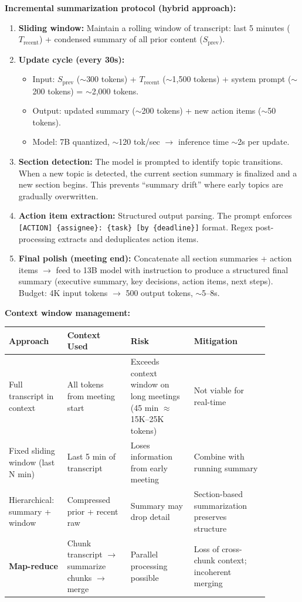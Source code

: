\textbf{Incremental summarization protocol (hybrid approach):}

\begin{enumerate}
  \item \textbf{Sliding window:} Maintain a rolling window of transcript: last 5 minutes ($T_{\text{recent}}$) + condensed summary of all prior content ($S_{\text{prev}}$).
  \item \textbf{Update cycle (every 30s):}
  \begin{itemize}
    \item Input: $S_{\text{prev}}$ ($\sim$300 tokens) + $T_{\text{recent}}$ ($\sim$1,500 tokens) + system prompt ($\sim$200 tokens) = $\sim$2,000 tokens.
    \item Output: updated summary ($\sim$200 tokens) + new action items ($\sim$50 tokens).
    \item Model: 7B quantized, $\sim$120 tok/sec $\rightarrow$ inference time $\sim$2s per update.
  \end{itemize}
  \item \textbf{Section detection:} The model is prompted to identify topic transitions. When a new topic is detected, the current section summary is finalized and a new section begins. This prevents ``summary drift'' where early topics are gradually overwritten.
  \item \textbf{Action item extraction:} Structured output parsing. The prompt enforces \texttt{[ACTION] \{assignee\}: \{task\} [by \{deadline\}]} format. Regex post-processing extracts and deduplicates action items.
  \item \textbf{Final polish (meeting end):} Concatenate all section summaries + action items $\rightarrow$ feed to 13B model with instruction to produce a structured final summary (executive summary, key decisions, action items, next steps). Budget: 4K input tokens $\rightarrow$ 500 output tokens, $\sim$5--8s.
\end{enumerate}

\textbf{Context window management:}

\begin{tabular}{|p{0.18\linewidth}|p{0.22\linewidth}|p{0.22\linewidth}|p{0.26\linewidth}|}
\hline
\textbf{Approach} & \textbf{Context Used} & \textbf{Risk} & \textbf{Mitigation} \\
\hline
Full transcript in context & All tokens from meeting start & Exceeds context window on long meetings (45 min $\approx$ 15K--25K tokens) & Not viable for real-time \\
\hline
Fixed sliding window (last N min) & Last 5 min of transcript & Loses information from early meeting & Combine with running summary \\
\hline
Hierarchical: summary + window & Compressed prior + recent raw & Summary may drop detail & Section-based summarization preserves structure \\
\hline
\textbf{Map-reduce} & Chunk transcript $\rightarrow$ summarize chunks $\rightarrow$ merge & Parallel processing possible & Loss of cross-chunk context; incoherent merging \\
\hline
\end{tabular}

